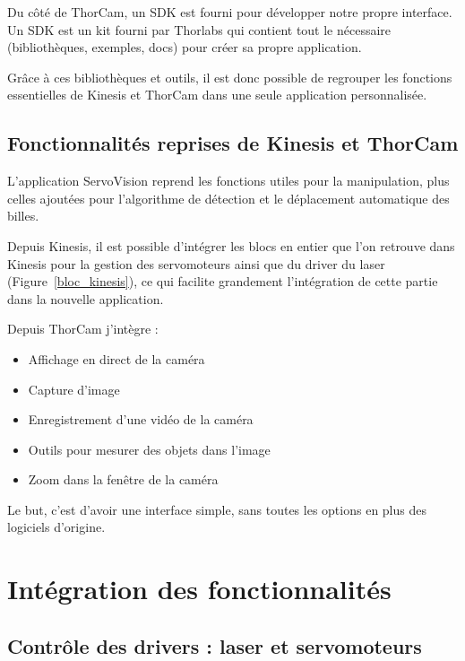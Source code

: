 Du côté de ThorCam, un SDK est fourni pour développer notre propre interface. Un SDK est un kit fourni par Thorlabs qui contient tout le nécessaire (bibliothèques, exemples, docs) pour créer sa propre application.

Grâce à ces bibliothèques et outils, il est donc possible de regrouper les fonctions essentielles de Kinesis et ThorCam dans une seule application personnalisée.

\subsection{Fonctionnalités reprises de Kinesis et ThorCam}

L'application ServoVision reprend les fonctions utiles pour la manipulation, plus celles ajoutées pour l'algorithme de détection et le déplacement automatique des billes.

Depuis Kinesis, il est possible d'intégrer les blocs en entier que l'on retrouve dans Kinesis pour la gestion des servomoteurs ainsi que du driver du laser (Figure~\ref{bloc_kinesis}), ce qui facilite grandement l'intégration de cette partie dans la nouvelle application.

Depuis ThorCam j'intègre :
\begin{itemize}[label=\textbullet]
    \item Affichage en direct de la caméra
    \item Capture d'image
    \item Enregistrement d'une vidéo de la caméra
    \item Outils pour mesurer des objets dans l'image
    \item Zoom dans la fenêtre de la caméra
\end{itemize}

Le but, c'est d'avoir une interface simple, sans toutes les options en plus des logiciels d'origine.

\section{Intégration des fonctionnalités}
\subsection{Contrôle des drivers : laser et servomoteurs}
\subsection{}